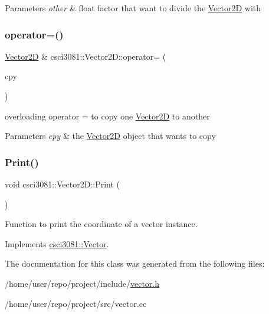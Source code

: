 \begin{DoxyParams}{Parameters}
{\em other} & float factor that want to divide the \hyperlink{classcsci3081_1_1Vector2D}{Vector2D} with \\
\hline
\end{DoxyParams}
\mbox{\label{classcsci3081_1_1Vector2D_a91ae4915d5eee2fcccf2fedf6d6e7309}} 
\subsubsection{\texorpdfstring{operator=()}{operator=()}}
{\footnotesize\ttfamily \hyperlink{classcsci3081_1_1Vector2D}{Vector2D} \& csci3081\+::\+Vector2\+D\+::operator= (\begin{DoxyParamCaption}\item[{const \hyperlink{classcsci3081_1_1Vector2D}{Vector2D} \&}]{cpy }\end{DoxyParamCaption})}



overloading operator = to copy one \hyperlink{classcsci3081_1_1Vector2D}{Vector2D} to another 


\begin{DoxyParams}{Parameters}
{\em cpy} & the \hyperlink{classcsci3081_1_1Vector2D}{Vector2D} object that wants to copy \\
\hline
\end{DoxyParams}
\mbox{\label{classcsci3081_1_1Vector2D_af849fc65ec2d153b53884c8de818fae6}} 
\subsubsection{\texorpdfstring{Print()}{Print()}}
{\footnotesize\ttfamily void csci3081\+::\+Vector2\+D\+::\+Print (\begin{DoxyParamCaption}{ }\end{DoxyParamCaption})\hspace{0.3cm}{\ttfamily [virtual]}}



Function to print the coordinate of a vector instance. 



Implements \hyperlink{classcsci3081_1_1Vector_a8f0661975d9635c803551cd778f75ed4}{csci3081\+::\+Vector}.



The documentation for this class was generated from the following files\+:\begin{DoxyCompactItemize}
\item 
/home/user/repo/project/include/\hyperlink{vector_8h}{vector.\+h}\item 
/home/user/repo/project/src/vector.\+cc\end{DoxyCompactItemize}
